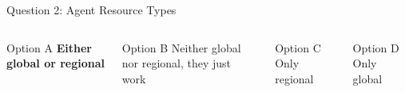 \documentclass[aspectratio=169]{beamer}
\begin{document}
\begin{frame}{Question 2: Agent Resource Types}
    \begin{center}
    \end{center}
    
    \vspace{1em}
    
    \begin{columns}
        \begin{block}{Option A}
            \textcolor{googlegreen}{\faCheckCircle} \textbf{Either global or regional}
        \end{block}
        
        \begin{block}{Option B}
            \textcolor{googlered}{\faTimesCircle} Neither global nor regional, they just work
        \end{block}
        
        \begin{block}{Option C}
            \textcolor{googlered}{\faTimesCircle} Only regional
        \end{block}
        
        \begin{block}{Option D}
            \textcolor{googlered}{\faTimesCircle} Only global
        \end{block}
    \end{columns}
\end{frame}
\end{document}

